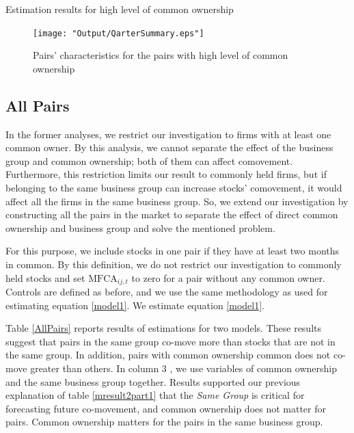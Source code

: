 			{\begin{table}[htbp]
					\centering
					\caption{\scriptsize Estimation results for high level of common ownership}
					\label{QTimemresult2subsample}
					{
						\resizebox{\textwidth}{!}{
						
						}
					}
			\end{table}}
			
			\begin{figure}[htbp]
				\centering  
				\texttt{[image: "Output/QarterSummary.eps"]}
				\caption{Pairs' characteristics for the pairs with high level of common ownership}
				\label{QarterSummary}
			\end{figure}
			

				
				
				\FloatBarrier
				
				\subsection{All Pairs}
				
	In the former analyses, we restrict our investigation to firms with at least one common owner. By this analysis, we cannot separate the effect of the business group and common ownership; both of them can affect comovement. Furthermore, this restriction limits our result to commonly held firms, but if belonging to the same business group can increase stocks' comovement, it would affect all the firms in the same business group. 
	So, we extend our investigation by constructing all the pairs in the market to separate the effect of direct common ownership and business group and solve the mentioned problem. 
	
	For this purpose, we include stocks in one pair if they have at least two months in common. By this definition, we do not restrict our investigation to commonly held stocks and set $\text{MFCA}_{ij,t}$ to zero for a pair without any common owner. Controls are defined as before, and we use the same methodology as used for estimating equation \ref{model1}. We estimate equation \ref{model1}. 
	
	Table \ref{AllPairs} reports results of estimations for two models. These results suggest that pairs in the same group co-move more than stocks that are not in the same group. In addition, pairs with common ownership common does not co-move greater than others. In column 3 , we use variables of common ownership and the same business group together. Results supported our previous explanation of table \ref{mresult2part1} that the \textit{Same Group} is critical for forecasting future co-movement, and common ownership does not matter for pairs. Common ownership matters for the pairs in the same business group.
					
